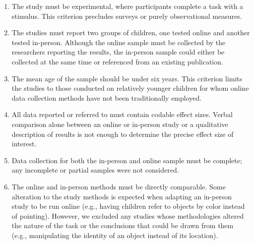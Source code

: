 \documentclass[
  man,floatsintext]{apa6}
\begin{document}
\begin{enumerate}
\def\labelenumi{\arabic{enumi}.}
\item
  The study must be experimental, where participants complete a task with a stimulus. This criterion precludes surveys or purely observational measures.
\item
  The studies must report two groups of children, one tested online and another tested in-person. Although the online sample must be collected by the researchers reporting the results, the in-person sample could either be collected at the same time or referenced from an existing publication.
\item
  The mean age of the sample should be under six years. This criterion limits the studies to those conducted on relatively younger children for whom online data collection methods have not been traditionally employed.
\item
  All data reported or referred to must contain codable effect sizes. Verbal comparison alone between an online or in-person study or a qualitative description of results is not enough to determine the precise effect size of interest.
\item
  Data collection for both the in-person and online sample must be complete; any incomplete or partial samples were not considered.
\item
  The online and in-person methods must be directly comparable. Some alteration to the study methods is expected when adapting an in-person study to be run online (e.g., having children refer to objects by color instead of pointing). However, we excluded any studies whose methodologies altered the nature of the task or the conclusions that could be drawn from them (e.g., manipulating the identity of an object instead of its location).
\end{enumerate}
\end{document}
